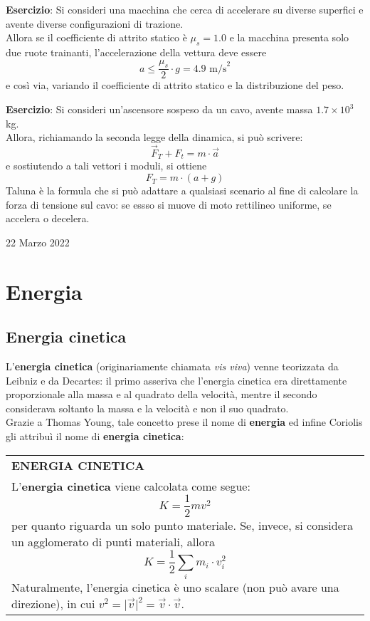 \documentclass[a4paper]{extarticle}
\renewcommand\arraystretch{}
\begin{document}
\vspace{1em}
\noindent
\textbf{Esercizio}: Si consideri una macchina che cerca di accelerare su diverse superfici e avente diverse configurazioni di trazione.\\
Allora se il coefficiente di attrito statico è $\mu_s=1.0$ e la macchina presenta solo due ruote trainanti, l'accelerazione della vettura deve essere
\[a \leq \frac{\mu_s}{2} \cdot g = 4.9 \text{ m/s}^2\]
e così via, variando il coefficiente di attrito statico e la distribuzione del peso.

\vspace{1em}
\noindent
\textbf{Esercizio}: Si consideri un'ascensore sospeso da un cavo, avente massa $1.7 \times 10^3$ kg.\\
Allora, richiamando la seconda legge della dinamica, si può scrivere:
\[\vec F_T + F_t = m \cdot \vec a\]
e sostiutendo a tali vettori i moduli, si ottiene
\[F_T = m \cdot (a + g)\]
Taluna è la formula che si può adattare a qualsiasi scenario al fine di calcolare la forza di tensione sul cavo: se essso si muove di moto rettilineo uniforme, se accelera o decelera.

\newpage
\noindent
\begin{center}
  22 Marzo 2022
\end{center}
\section{Energia}

\vspace{1em}
\subsection{Energia cinetica}
L'\textbf{energia cinetica} (originariamente chiamata \emph{vis viva}) venne teorizzata da Leibniz e da Decartes: il primo asseriva che l'energia cinetica era direttamente proporzionale alla massa e al quadrato della velocità, mentre il secondo considerava soltanto la massa e la velocità e non il suo quadrato.\\
Grazie a Thomas Young, tale concetto prese il nome di \textbf{energia} ed infine Coriolis gli attribuì il nome di \textbf{energia cinetica}:

\vspace{1em}
\setlength{\tabcolsep}{14pt}
\renewcommand{\arraystretch}{2}
\noindent
\begin{tabularx}{\textwidth}{@{}|P|@{}}
    \hline
    {\textbf{ENERGIA CINETICA}}\\
    \parbox{\linewidth}{L'\textbf{energia cinetica} viene calcolata come segue:
    \[\boxed{K=\frac{1}{2}mv^2}\]
    per quanto riguarda un solo punto materiale. Se, invece, si considera un agglomerato di punti materiali, allora
    \[\boxed{K=\frac{1}{2} \sum_{i} m_i \cdot v_i^2}\]
    Naturalmente, l'energia cinetica è uno scalare (non può avare una direzione), in cui $v^2=\vert \vec v \vert^2 = \vec v \cdot \vec v $.\vspace{3mm}}\\
    \hline
\end{tabularx}
\end{document}
